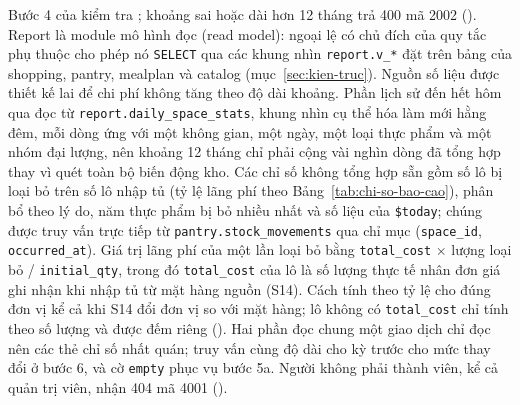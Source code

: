 
Bước 4 của  kiểm tra ; khoảng sai hoặc dài hơn 12 tháng trả 400 mã 2002 (). Report là module mô hình đọc (read model): ngoại lệ có chủ đích của quy tắc phụ thuộc cho phép nó \texttt{SELECT} qua các khung nhìn \texttt{report.v\_*} đặt trên bảng của shopping, pantry, mealplan và catalog (mục~\ref{sec:kien-truc}). Nguồn số liệu được thiết kế lai để chi phí không tăng theo độ dài khoảng. Phần lịch sử đến hết hôm qua đọc từ \texttt{report.daily\_space\_stats}, khung nhìn cụ thể hóa làm mới hằng đêm, mỗi dòng ứng với một không gian, một ngày, một loại thực phẩm và một nhóm đại lượng, nên khoảng 12 tháng chỉ phải cộng vài nghìn dòng đã tổng hợp thay vì quét toàn bộ biến động kho. Các chỉ số không tổng hợp sẵn gồm số lô bị loại bỏ trên số lô nhập tủ (tỷ lệ lãng phí theo Bảng~\ref{tab:chi-so-bao-cao}), phân bổ theo lý do, năm thực phẩm bị bỏ nhiều nhất và số liệu của \texttt{\$today}; chúng được truy vấn trực tiếp từ \texttt{pantry.stock\_movements} qua chỉ mục (\texttt{space\_id}, \texttt{occurred\_at}). Giá trị lãng phí của một lần loại bỏ bằng \texttt{total\_cost} $\times$ lượng loại bỏ / \texttt{initial\_qty}, trong đó \texttt{total\_cost} của lô là số lượng thực tế nhân đơn giá ghi nhận khi nhập tủ từ mặt hàng nguồn (S14). Cách tính theo tỷ lệ cho đúng đơn vị kể cả khi S14 đổi đơn vị so với mặt hàng; lô không có \texttt{total\_cost} chỉ tính theo số lượng và được đếm riêng (). Hai phần đọc chung một giao dịch chỉ đọc nên các thẻ chỉ số nhất quán; truy vấn cùng độ dài cho kỳ trước cho mức thay đổi ở bước 6, và cờ \texttt{empty} phục vụ bước 5a. Người không phải thành viên, kể cả quản trị viên, nhận 404 mã 4001 ().

